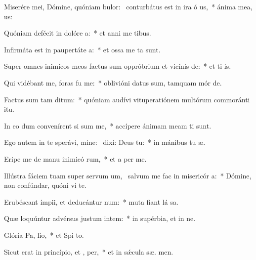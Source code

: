 \item Miserére mei, Dómine, quóniam bulor:~\pscross{} conturbátus est in ira ó us,~* ánima mea,   us:
\item Quóniam defécit in dolóre  a:~* et anni me  tibus.
\item Infirmáta est in paupertáte  a:~* et ossa me ta sunt.
\item Super omnes inimícos meos factus sum oppróbrium et vicínis  de:~* et ti  is.
\item Qui vidébant me, foras fu  me:~* oblivióni datus sum, tamquam mór  de.
\item Factus sum tam  ditum:~* quóniam audívi vituperatiónem multórum commoránti  itu.
\item In eo dum convenírent si sum me,~* accípere ánimam meam ti sunt.
\item Ego autem in te sperávi, mine:~\pscross{} dixi: Deus   tu:~* in mánibus tu  æ.
\item Eripe me de manu inimicó rum,~* et a per me.
\item Illústra fáciem tuam super servum um,~\pscross{} salvum me fac in misericór a:~* Dómine, non confúndar, quóni vi te.
\item Erubéscant ímpii, et deducántur  num:~* muta fiant lá sa.
\item Quæ loquúntur advérsus justum intem:~* in supérbia, et in ne.
\item Glória Pa,  lio,~* et Spi to.
\item Sicut erat in princípio, et ,  per,~* et in sǽcula sæ. men.
